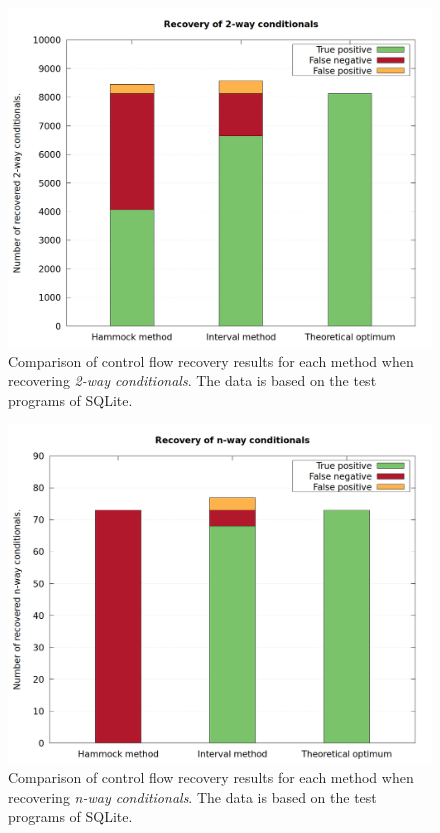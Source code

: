 \begin{figure}[htbp]
	\centering
	\includegraphics[width=\textwidth]{inc/appendices/test_program_results/sqlite/results_2-way.png}
	\caption{Comparison of control flow recovery results for each method when recovering \textit{2-way conditionals}. The data is based on the test programs of SQLite.}
	\label{fig:sqlite_results_2way}
\end{figure}

\begin{figure}[htbp]
	\centering
	\includegraphics[width=\textwidth]{inc/appendices/test_program_results/sqlite/results_n-way.png}
	\caption{Comparison of control flow recovery results for each method when recovering \textit{n-way conditionals}. The data is based on the test programs of SQLite.}
	\label{fig:sqlite_results_nway}
\end{figure}

